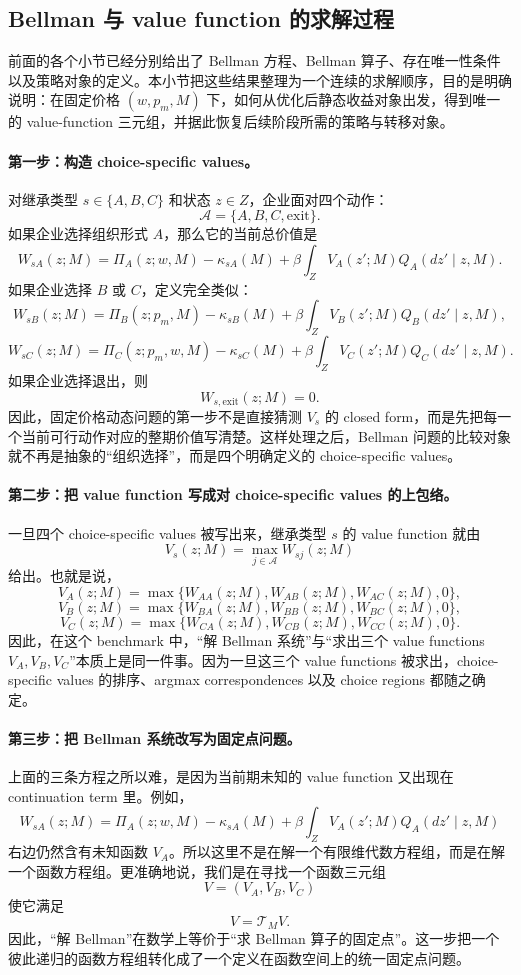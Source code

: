 \subsection{Bellman 与 value function 的求解过程}

前面的各个小节已经分别给出了 Bellman 方程、Bellman 算子、存在唯一性条件以及策略对象的定义。本小节把这些结果整理为一个连续的求解顺序，目的是明确说明：在固定价格 $(w,p_m,M)$ 下，如何从优化后静态收益对象出发，得到唯一的 value-function 三元组，并据此恢复后续阶段所需的策略与转移对象。

\paragraph{第一步：构造 choice-specific values。}
对继承类型 $s\in\{A,B,C\}$ 和状态 $z\in Z$，企业面对四个动作：
\[
\mathcal A=\{A,B,C,\mathrm{exit}\}.
\]
如果企业选择组织形式 $A$，那么它的当前总价值是
\[
W_{sA}(z;M)
=
\Pi_A(z;w,M)-\kappa_{sA}(M)+\beta\int_Z V_A(z';M)Q_A(dz'\mid z,M).
\]
如果企业选择 $B$ 或 $C$，定义完全类似：
\[
W_{sB}(z;M)
=
\Pi_B(z;p_m,M)-\kappa_{sB}(M)+\beta\int_Z V_B(z';M)Q_B(dz'\mid z,M),
\]
\[
W_{sC}(z;M)
=
\Pi_C(z;p_m,w,M)-\kappa_{sC}(M)+\beta\int_Z V_C(z';M)Q_C(dz'\mid z,M).
\]
如果企业选择退出，则
\[
W_{s,\mathrm{exit}}(z;M)=0.
\]
因此，固定价格动态问题的第一步不是直接猜测 $V_s$ 的 closed form，而是先把每一个当前可行动作对应的整期价值写清楚。这样处理之后，Bellman 问题的比较对象就不再是抽象的“组织选择”，而是四个明确定义的 choice-specific values。

\paragraph{第二步：把 value function 写成对 choice-specific values 的上包络。}
一旦四个 choice-specific values 被写出来，继承类型 $s$ 的 value function 就由
\[
V_s(z;M)=\max_{j\in\mathcal A}W_{sj}(z;M)
\]
给出。也就是说，
\[
V_A(z;M)=\max\{W_{AA}(z;M),W_{AB}(z;M),W_{AC}(z;M),0\},
\]
\[
V_B(z;M)=\max\{W_{BA}(z;M),W_{BB}(z;M),W_{BC}(z;M),0\},
\]
\[
V_C(z;M)=\max\{W_{CA}(z;M),W_{CB}(z;M),W_{CC}(z;M),0\}.
\]
因此，在这个 benchmark 中，“解 Bellman 系统”与“求出三个 value functions $V_A,V_B,V_C$”本质上是同一件事。因为一旦这三个 value functions 被求出，choice-specific values 的排序、argmax correspondences 以及 choice regions 都随之确定。

\paragraph{第三步：把 Bellman 系统改写为固定点问题。}
上面的三条方程之所以难，是因为当前期未知的 value function 又出现在 continuation term 里。例如，
\[
W_{sA}(z;M)
=
\Pi_A(z;w,M)-\kappa_{sA}(M)+\beta\int_Z V_A(z';M)Q_A(dz'\mid z,M)
\]
右边仍然含有未知函数 $V_A$。所以这里不是在解一个有限维代数方程组，而是在解一个函数方程组。更准确地说，我们是在寻找一个函数三元组
\[
V=(V_A,V_B,V_C)
\]
使它满足
\[
V=\mathcal T_MV.
\]
因此，“解 Bellman”在数学上等价于“求 Bellman 算子的固定点”。这一步把一个彼此递归的函数方程组转化成了一个定义在函数空间上的统一固定点问题。

